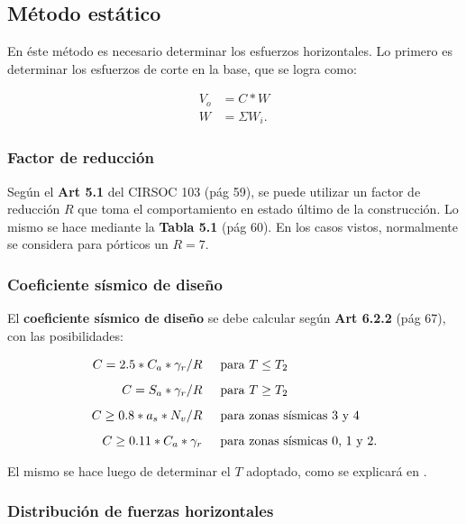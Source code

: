 \documentclass[../main.tex]{subfiles}
\begin{document}
\subsection{Método estático}

En éste método es necesario determinar los esfuerzos horizontales. Lo primero
es determinar los esfuerzos de corte en la base, que se logra como:

\begin{align*}
  V_o &=  C * W \\[5pt] 
  W &= \Sigma W_i
.\end{align*}

\subsubsection{Factor de reducción}

Según el \textbf{Art 5.1} del CIRSOC 103 (pág 59), se puede utilizar un factor
de reducción $R$ que toma el comportamiento en estado último de la construcción.
Lo mismo se hace mediante la  \textbf{Tabla 5.1} (pág 60). En los casos vistos,
normalmente se considera para pórticos un $R=7$.

\subsubsection{Coeficiente sísmico de diseño}

El \textbf{coeficiente sísmico de diseño} se debe calcular según \textbf{Art 6.2.2}
(pág 67), con las posibilidades:

\begin{align*}
  C = 2.5 * C_a * \gamma_r / R \hspace{0.5cm} &\text{para } T \leq T_2 \\[5pt]
  C = S_a * \gamma_r / R \hspace{0.5cm} &\text{para } T \geq T_2 \\[5pt]
  C \geq 0.8 * a_s * N_v / R \hspace{0.5cm}&\text{para zonas sísmicas 3 y 4}  \\[5pt]
  C \geq  0.11 * C_a * \gamma_r \hspace{0.5cm} &\text{para zonas sísmicas 0, 1 y 2}
.\end{align*}

El mismo se hace luego de determinar el $T$ adoptado, como se explicará en
.


\subsubsection{Distribución de fuerzas horizontales}
\end{document}
